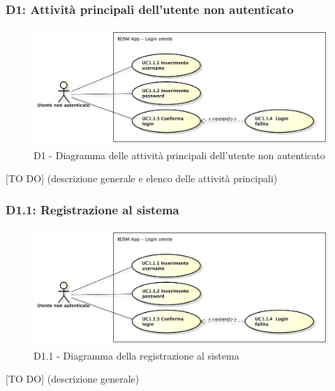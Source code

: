 		\subsubsection{D1: Attività principali dell'utente non autenticato} %
		\label{ssub:attivita_principali_dell_utente_non_autenticato}
		\begin{figure}[!htbp]
			\centering
			\centerline{\includegraphics[scale=0.45]{./images/UC1_1.pdf}}
			\caption{D1 - Diagramma delle attività principali dell'utente non autenticato}
		\end{figure}
		[TO DO] (descrizione generale e elenco delle attività principali)


		\subsubsection{D1.1: Registrazione al sistema} %
		\label{ssub:registrazione_al_sistema}
		\begin{figure}[!htbp]
			\centering
			\centerline{\includegraphics[scale=0.45]{./images/UC1_1.pdf}}
			\caption{D1.1 - Diagramma della registrazione al sistema}
		\end{figure}
		[TO DO] (descrizione generale)


